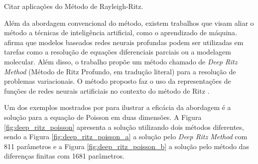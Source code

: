 \documentclass[
	12pt,				%
	openright,			%
    twoside,			%
	a4paper,			%
	english,			%
	french,				%
	spanish,			%
	brazil				%
	]{abntex2}
\numberwithin{lema}{chapter}
\numberwithin{teorema}{chapter}
\numberwithin{definicao}{chapter}
\numberwithin{exemplo}{chapter}
\numberwithin{figure}{chapter}
\begin{document}

{\color{red}Citar aplicações do Método de Rayleigh-Ritz.}

Além da abordagem convencional do método, existem trabalhos que visam aliar o método a técnicas de inteligência artificial, como o aprendizado de máquina.  afirma que modelos baseados redes neurais profundas podem ser utilizadas em tarefas como a resolução de equações diferenciais parciais ou a modelagem molecular. Além disso, o trabalho propõe um método chamado de \textit{Deep Ritz Method} (Método de Ritz Profundo, em tradução literal) para a resolução de problemas variacionais. O método proposto faz o uso da representações de funções de redes neurais artificiais no contexto do método de Ritz \cite{deep_ritz}. 

Um dos exemplos mostrados por  para ilustrar a eficácia da abordagem é a solução para a equação de Poisson em duas dimensões. A Figura \ref{fig:deep_ritz_poisson} apresenta a solução utilizando dois métodos diferentes, sendo a Figura \ref{fig:deep_ritz_poisson_a} a solução pelo \textit{Deep Ritz Method} com 811 parâmetros e a Figura \ref{fig:deep_ritz_poisson_b} a solução pelo método das diferenças finitas com 1681 parâmetros.
\end{document}
